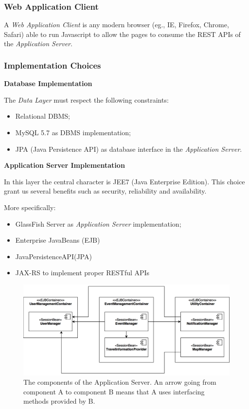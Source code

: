 \documentclass{article}
\begin{document}
	\subsubsection{Web Application Client}
	A \textit{Web Application Client} is any modern browser (eg., IE, Firefox, Chrome, Safari) able to run Javascript to allow the pages to consume the REST APIs of the \textit{Application Server}.


	\subsubsection{Implementation Choices}

	\textbf{Database Implementation}

	\medskip
	\noindent
	The \textit{Data Layer} must respect the following constraints: 
	\begin{itemize}
	\item Relational DBMS;
	\item MySQL 5.7 as DBMS implementation;
	\item JPA (Java Persistence API) as database interface in the \textit{Application Server}.
	\end{itemize}

	\bigskip
	\noindent
	\textbf{Application Server Implementation}

	\medskip
	\noindent
	In this layer the central character is JEE7 (Java Enterprise Edition).
	This choice grant us several benefits such as security, reliability and availability.


	More specifically:

	\begin{itemize}
	\item GlassFish Server as \textit{Application Server} implementation;
	\item Enterprise JavaBeans (EJB)
	\item JavaPersistenceAPI(JPA)
	\item JAX-RS to implement proper RESTful APIs
	\end{itemize}

	\bigskip
	\begin{figure}[!ht]
	\centering
	\includegraphics[width=\textwidth]{img/diagrams/asc.png}
	\caption{The components of the Application Server. An arrow going from component A to component B means that A uses interfacing methods provided by B.}
	\end{figure}
\end{document}
